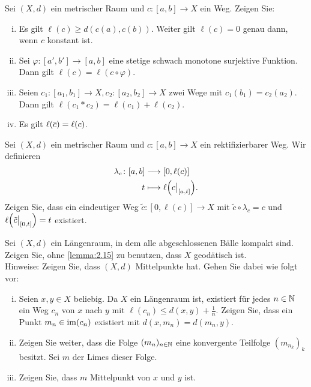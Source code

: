 	\begin{aufgabe}
		\label{aufg:4.2}	
		Sei $(X,d)$ ein metrischer Raum und $c \colon [a,b] \rightarrow X$ ein Weg.
		Zeigen Sie:
		\begin{enumerate}[(i)]
			\item Es gilt $\ell(c) \geq d(c(a),c(b))$.
			Weiter gilt $\ell(c) = 0$ genau dann, wenn $c$ konstant ist.
			\item Sei $\varphi\colon [a',b'] \rightarrow [a,b]$ eine stetige schwach monotone surjektive Funktion.
			Dann gilt $\ell(c) = \ell(c \circ \varphi)$.
			\item Seien $c_1\colon [a_1,b_1] \rightarrow X, c_2\colon [a_2,b_2] \rightarrow X$ zwei Wege mit $c_1(b_1) = c_2(a_2)$.
			Dann gilt $\ell(c_1 * c_2) = \ell(c_1) + \ell(c_2)$.
			\item Es gilt $\ell(\overline{c}) = \ell(c)$.
		\end{enumerate}
	\end{aufgabe}
	
	\begin{aufgabe}
		\label{aufg:4.3}	
		Sei $(X,d)$ ein metrischer Raum und $c \colon [a,b] \rightarrow X$ ein rektifizierbarer Weg.
		Wir definieren
		\begin{align*}
			\lambda_c \colon [a,b] &\longrightarrow [0,\ell(c)] \\
			t &\longmapsto \ell\enbrace*{c \big|_{[a,t]}}.
		\end{align*}
		Zeigen Sie, dass ein eindeutiger Weg $\tilde{c}\colon [0,\ell(c)] \rightarrow X$ mit $\tilde{c} \circ \lambda_c = c$ und $\ell\enbrace*{\tilde{c}\big|_{[0,t]}} = t$ existiert.
	\end{aufgabe}
	
	\begin{aufgabe}
		\label{aufg:4.4}	
		Sei $(X,d)$ ein Längenraum, in dem alle abgeschlossenen Bälle kompakt sind.
		Zeigen Sie, ohne \autoref{lemma:2.15} zu benutzen, dass $X$ geodätisch ist. \\
		Hinweise: Zeigen Sie, dass $(X,d)$ Mittelpunkte hat.
		Gehen Sie dabei wie folgt vor:
		\begin{enumerate}[(i)]
			\item Seien $x,y \in X$ beliebig.
			Da $X$ ein Längenraum ist, existiert für jedes $n \in \mathbb{N}$ ein Weg $c_n$ von $x$ nach $y$ mit $\ell(c_n) \leq d(x,y) + \frac{1}{n}$.
			Zeigen Sie, dass ein Punkt $m_n \in \operatorname{im}(c_n)$ existiert mit $d(x,m_n) = d(m_n,y)$.
			\item Zeigen Sie weiter, dass die Folge $(m_n)_{n \in \mathbb{N}}$ eine konvergente Teilfolge $(m_{n_k})_k$ besitzt.
			Sei $m$ der Limes dieser Folge.
			\item Zeigen Sie, dass $m$ Mittelpunkt von $x$ und $y$ ist.
		\end{enumerate}
	\end{aufgabe}
	
